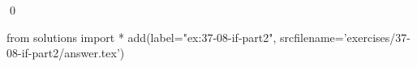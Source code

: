 
\begin{ex}
  \label{ex:37-08-if-part2}
  
  \qed
\end{ex}
\begin{python0}
from solutions import *
add(label="ex:37-08-if-part2",
    srcfilename='exercises/37-08-if-part2/answer.tex')
\end{python0}
